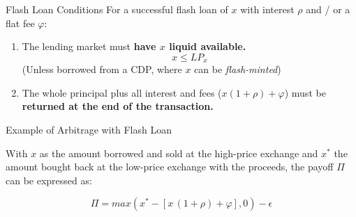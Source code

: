 \documentclass[]{beamer}
\begin{document}
\begin{frame}{Flash Loan Conditions}
For a successful flash loan of $x$ with interest $\rho$  and / or a flat fee $\varphi$:

\vspace{1em}
\begin{enumerate}
	\item The lending market must \textbf{have $x$ liquid available.}\\
	\begin{equation*}
		x \leq LP_{x}
	\end{equation*}
	(Unless borrowed from a CDP, where $x$ can be \textit{flash-minted})
	\vspace{1em}
	\item The whole principal plus all interest and fees ($ x(1+\rho) + \varphi$) must be \textbf{returned at the end of the transaction.}
\end{enumerate}


	
\end{frame}


\begin{frame}{Example of Arbitrage with Flash Loan}

With $x$ as the amount borrowed and sold at the high-price exchange and $x^\ast$ the amount bought back at the low-price exchange with the proceeds, the payoff $\Pi$ can be expressed as:

\begin{equation*}
	\Pi = max (x^{\ast}-[x \,(1+\rho) + \varphi ],0) - \epsilon
\end{equation*}

\vspace{0.5 em}

	
\end{frame}
\end{document}

